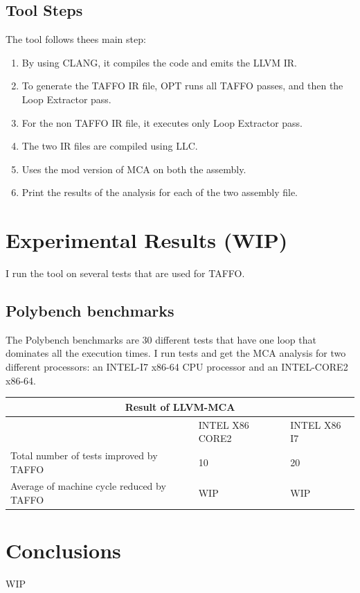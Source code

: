 \subsection{Tool Steps}
The tool follows thees main step:
\begin{enumerate}
\item By using CLANG, it compiles the code and emits the LLVM IR.
\item To generate the TAFFO IR file, OPT runs all TAFFO passes, and then the Loop Extractor pass.
\item For the non TAFFO IR file, it executes only Loop Extractor pass.
\item The two IR files are compiled using LLC.
\item Uses the mod version of MCA on both the assembly.
\item Print the results of the analysis for each of the two assembly file.
\end{enumerate}

\section{Experimental Results (WIP)}
I run the tool on several tests that are used for TAFFO.

\subsection{Polybench benchmarks}
The Polybench benchmarks are 30 different tests that have one loop that dominates all the execution times.
I run tests and get the MCA analysis for two different processors: an INTEL-I7 x86-64 CPU processor and an INTEL-CORE2 x86-64.

\begin{center}
\begin{tabular}{ |p{7cm} | p{4cm} | p{4cm}| }
 \hline
 \multicolumn{3}{|c|}{Result of LLVM-MCA} \\
 \hline
   & INTEL X86 CORE2 & INTEL X86 I7\\
 \hline
  Total number of tests improved by TAFFO & 10 & 20 \\
  \hline
  Average of machine cycle reduced by TAFFO & WIP & WIP \\
  \hline

\end{tabular}
\end{center}


\section{Conclusions}

WIP

